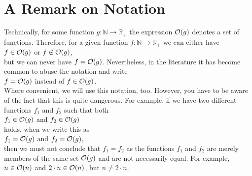 \section{A Remark on Notation}
Technically, for some function $g:\mathbb{N} \rightarrow \mathbb{R}_+$ the expression $\mathcal{O}(g)$
denotes a set of functions.  Therefore, for a given function $f:\mathbb{N} \rightarrow \mathbb{R}_+$ we can
either have
\\[0.2cm]
\hspace*{1.3cm}
$f \in \mathcal{O}(g)$ \quad or \quad $f \not\in \mathcal{O}(g)$,
\\[0.2cm]
but we can never have $f = \mathcal{O}(g)$.  Nevertheless, in the literature it has become common to abuse the
notation and write
\\[0.2cm]
\hspace*{1.3cm}
$f = \mathcal{O}(g)$ \quad instead of \quad $f \in \mathcal{O}(g)$.
\\[0.2cm]
Where convenient, we will use this notation, too.  However, you have to be aware of the fact that
this is quite dangerous.  For example, if we have two different functions $f_1$ and
$f_2$ such that both
\\[0.2cm]
\hspace*{1.3cm}
$f_1 \in \mathcal{O}(g)$ \quad and \quad $f_2 \in \mathcal{O}(g)$
\\[0.2cm]
holds, when we write this as
\\[0.2cm]
\hspace*{1.3cm}
$f_1 = \mathcal{O}(g)$ \quad and \quad $f_2 = \mathcal{O}(g)$,
\\[0.2cm]
then we must not conclude that $f_1 = f_2$ as the functions $f_1$ and $f_2$ are merely members of
the same set $\mathcal{O}(g)$ and are not necessarily equal.  For example, $n \in \mathcal{O}(n)$ and 
$2 \cdot n \in \mathcal{O}(n)$,  but $n \not= 2 \cdot n$.
\vspace*{0.3cm}

